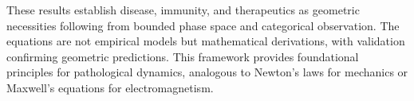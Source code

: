\documentclass[12pt,a4paper]{article}
\theoremstyle{definition}
\theoremstyle{remark}
\begin{document}
These results establish disease, immunity, and therapeutics as geometric necessities following from bounded phase space and categorical observation. The equations are not empirical models but mathematical derivations, with validation confirming geometric predictions. This framework provides foundational principles for pathological dynamics, analogous to Newton's laws for mechanics or Maxwell's equations for electromagnetism.



\end{document}
